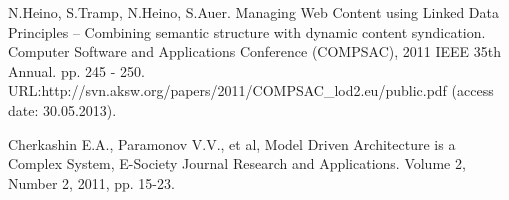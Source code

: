 \documentclass[conference]{IEEEtran}
\begin{document}
\begin{thebibliography}{11}
\bibitem{}
 N.Heino, S.Tramp, N.Heino, S.Auer. Managing Web Content using Linked Data Principles – Combining semantic structure with dynamic content syndication. Computer Software and Applications Conference (COMPSAC), 2011 IEEE 35th Annual. pp. 245 - 250. URL:http://svn.aksw.org/papers/2011/COMPSAC_lod2.eu/public.pdf (access date: 30.05.2013).

\bibitem{}
 Cherkashin E.A., Paramonov V.V., et al, Model Driven Architecture is a Complex System, E-Society Journal Research and Applications. Volume 2, Number 2, 2011, pp. 15-23.


\end{thebibliography}
\vspace{-2em}\mbox{} %
\end{document}
